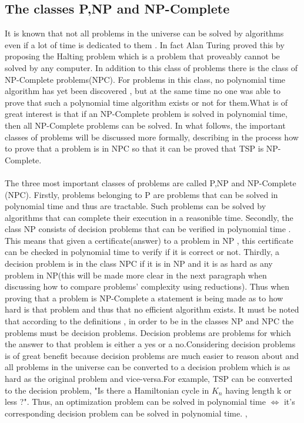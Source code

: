 \documentclass{article}
\begin{document}
\subsection{The classes P,NP and NP-Complete}
It is known that not all problems in the universe can be solved by algorithms even if a lot of time is dedicated to them . In fact Alan Turing proved this by proposing the Halting problem which is a problem that proveably cannot be solved by any computer. In addition to this class of problems there is the class of NP-Complete problems(NPC). For problems in this class, no polynomial time algorithm has yet been discovered , but at the same time no one was able to prove that such a polynomial time algorithm exists or not for them.What is of great interest is that if an NP-Complete problem is solved in polynomial time, then all NP-Complete problems can be solved.  In what follows, the important classes of problems will be discussed more formally, describing in the process how to prove that a problem is in NPC so that it can be proved that TSP is NP-Complete.  \cite{geeksforgeeks_2018_2}\\
\\
The three most important classes of problems are called P,NP and NP-Complete (NPC). Firstly, problems belonging to P are problems that can be solved in polynomial time and thus are tractable. Such problems can be solved by algorithms that can complete their execution in a reasonible time. Secondly, the class NP consists of decision problems that can be verified in polynomial time . This means that given a certificate(answer) to a problem in NP , this certificate can be checked in polynomial time to verify if it is correct or not. Thirdly, a decision problem is in the class NPC if it is in NP and it is as hard as any problem in NP(this will be made more clear in the next paragraph when discussing how to compare problems' complexity using reductions). Thus when proving that a problem is NP-Complete a statement is being made as to how hard is that problem and thus that no efficient algorithm exists. It must be noted that according to the definitions , in order to be in the classes NP and NPC the problems must be decision problems. Decision problems are problems for which the answer to that problem is either a yes or a no.Considering decision problems is of great benefit because decision problems are much easier to reason about and all problems in the universe can be converted to a decision problem which is as hard as the original problem and vice-versa.For example, TSP can be converted to the decision problem, "Is there a Hamiltonian cycle in $K_n$ having length k or less ?". Thus, an optimization problem can be solved in polynomial time $\iff$ it's corresponding decision problem can be solved in polynomial time.  \cite{cormen_leiserson_rivest_stein}, \cite{problems_in_computer_science} \\
\end{document}

